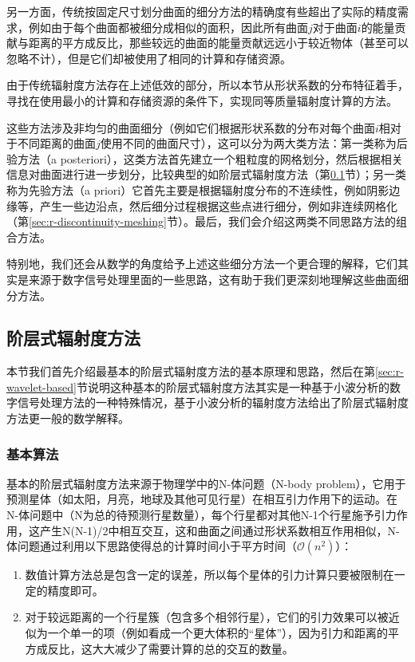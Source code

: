 另一方面，传统按固定尺寸划分曲面的细分方法的精确度有些超出了实际的精度需求，例如由于每个曲面都被细分成相似的面积，因此所有曲面$j$对于曲面$i$的能量贡献与距离的平方成反比，那些较远的曲面的能量贡献远远小于较近物体（甚至可以忽略不计），但是它们却被使用了相同的计算和存储资源。

由于传统辐射度方法存在上述低效的部分，所以本节从形状系数的分布特征着手，寻找在使用最小的计算和存储资源的条件下，实现同等质量辐射度计算的方法。

这些方法涉及非均匀的曲面细分（例如它们根据形状系数的分布对每个曲面$i$相对于不同距离的曲面$j$使用不同的曲面尺寸），这可以分为两大类方法：第一类称为后验方法（a posteriori），这类方法首先建立一个粗粒度的网格划分，然后根据相关信息对曲面进行进一步划分，比较典型的如阶层式辐射度方法（第\ref{sec:r-hierarchical-radiosity}节）；另一类称为先验方法（a priori）它首先主要是根据辐射度分布的不连续性，例如阴影边缘等，产生一些边沿点，然后细分过程根据这些点进行细分，例如非连续网格化（第\ref{sec:r-discontinuity-meshing}节）。最后，我们会介绍这两类不同思路方法的组合方法。

特别地，我们还会从数学的角度给予上述这些细分方法一个更合理的解释，它们其实是来源于数字信号处理里面的一些思路，这有助于我们更深刻地理解这些曲面细分方法。




\subsection{阶层式辐射度方法}\label{sec:r-hierarchical-radiosity}
本节我们首先介绍最基本的阶层式辐射度方法的基本原理和思路，然后在第\ref{sec:r-wavelet-based}节说明这种基本的阶层式辐射度方法其实是一种基于小波分析的数字信号处理方法的一种特殊情况，基于小波分析的辐射度方法给出了阶层式辐射度方法更一般的数学解释。




\subsubsection{基本算法}
基本的阶层式辐射度方法来源于物理学中的N-体问题（N-body problem）\cite{a:AnEfficientProgramforManyBodySimulation}，它用于预测星体（如太阳，月亮，地球及其他可见行星）在相互引力作用下的运动。在N-体问题中（N为总的待预测行星数量），每个行星都对其他N-1个行星施予引力作用，这产生N(N-1)/2中相互交互，这和曲面之间通过形状系数相互作用相似，N-体问题通过利用以下思路使得总的计算时间小于平方时间（$\mathcal{O}(n^{2})$）：

\begin{enumerate}
	\item 数值计算方法总是包含一定的误差，所以每个星体的引力计算只要被限制在一定的精度即可。
	\item 对于较远距离的一个行星簇（包含多个相邻行星），它们的引力效果可以被近似为一个单一的项（例如看成一个更大体积的“星体”），因为引力和距离的平方成反比，这大大减少了需要计算的总的交互的数量。
\end{enumerate}

